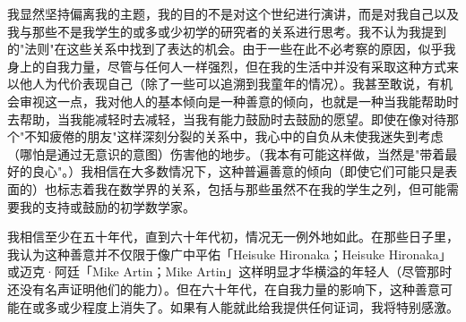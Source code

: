 我显然坚持偏离我的主题，我的目的不是对这个世纪进行演讲，而是对我自己以及我与那些不是我学生的或多或少初学的研究者的关系进行思考。我不认为我提到的"法则"在这些关系中找到了表达的机会。由于一些在此不必考察的原因，似乎我身上的自我力量，尽管与任何人一样强烈，但在我的生活中并没有采取这种方式来以他人为代价表现自己（除了一些可以追溯到我童年的情况）。我甚至敢说，有机会审视这一点，我对他人的基本倾向是一种善意的倾向，也就是一种当我能帮助时去帮助，当我能减轻时去减轻，当我有能力鼓励时去鼓励的愿望。即使在像对待那个"不知疲倦的朋友"这样深刻分裂的关系中，我心中的自负从未使我迷失到考虑（哪怕是通过无意识的意图）伤害他的地步。（我本有可能这样做，当然是"带着最好的良心"。）我相信在大多数情况下，这种普遍善意的倾向（即使它们可能只是表面的）也标志着我在数学界的关系，包括与那些虽然不在我的学生之列，但可能需要我的支持或鼓励的初学数学家。

我相信至少在五十年代，直到六十年代初，情况无一例外地如此。在那些日子里，我认为这种善意并不仅限于像广中平佑「Heisuke Hironaka；Heisuke Hironaka」或迈克·阿廷「Mike Artin；Mike Artin」这样明显才华横溢的年轻人（尽管那时还没有名声证明他们的能力）。但在六十年代，在自我力量的影响下，这种善意可能在或多或少程度上消失了。如果有人能就此给我提供任何证词，我将特别感激。

